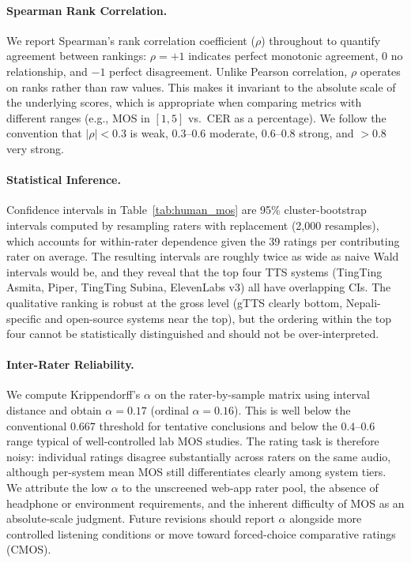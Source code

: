 \documentclass[11pt]{article}
\begin{document}
\paragraph{Spearman Rank Correlation.} We report Spearman's rank correlation coefficient ($\rho$) throughout to quantify agreement between rankings: $\rho = +1$ indicates perfect monotonic agreement, $0$ no relationship, and $-1$ perfect disagreement. Unlike Pearson correlation, $\rho$ operates on ranks rather than raw values. This makes it invariant to the absolute scale of the underlying scores, which is appropriate when comparing metrics with different ranges (e.g., MOS in $[1,5]$ vs.\ CER as a percentage). We follow the convention that $|\rho| < 0.3$ is weak, $0.3$--$0.6$ moderate, $0.6$--$0.8$ strong, and $>0.8$ very strong.

\paragraph{Statistical Inference.} Confidence intervals in Table~\ref{tab:human_mos} are 95\% cluster-bootstrap intervals computed by resampling raters with replacement (2{,}000 resamples), which accounts for within-rater dependence given the 39 ratings per contributing rater on average. The resulting intervals are roughly twice as wide as naive Wald intervals would be, and they reveal that the top four TTS systems (TingTing Asmita, Piper, TingTing Subina, ElevenLabs v3) all have overlapping CIs. The qualitative ranking is robust at the gross level (gTTS clearly bottom, Nepali-specific and open-source systems near the top), but the ordering within the top four cannot be statistically distinguished and should not be over-interpreted.

\paragraph{Inter-Rater Reliability.} We compute Krippendorff's $\alpha$ on the rater-by-sample matrix using interval distance and obtain $\alpha = 0.17$ (ordinal $\alpha = 0.16$). This is well below the conventional $0.667$ threshold for tentative conclusions and below the $0.4$--$0.6$ range typical of well-controlled lab MOS studies. The rating task is therefore noisy: individual ratings disagree substantially across raters on the same audio, although per-system mean MOS still differentiates clearly among system tiers. We attribute the low $\alpha$ to the unscreened web-app rater pool, the absence of headphone or environment requirements, and the inherent difficulty of MOS as an absolute-scale judgment. Future revisions should report $\alpha$ alongside more controlled listening conditions or move toward forced-choice comparative ratings (CMOS).
\end{document}
